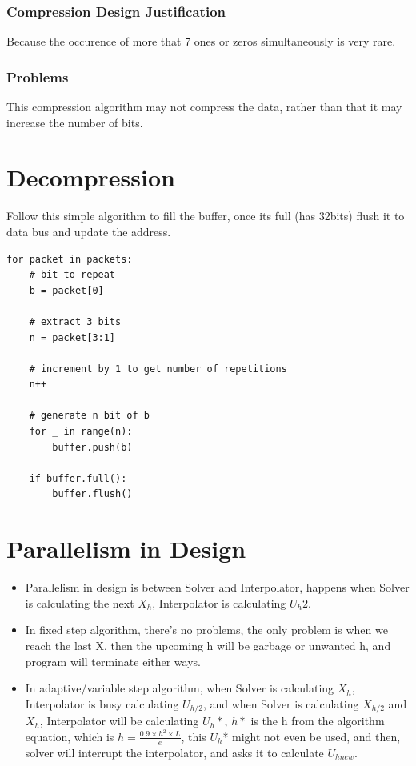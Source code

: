 \documentclass[12pt]{report}
\begin{document}
\subsubsection{Compression Design Justification}
Because the occurence of more that 7 ones or zeros simultaneously is very rare.

\subsubsection{Problems}
This compression algorithm may not compress the data, rather than that it may increase the number of bits.

\section{Decompression}
\label{sec:decomp}
Follow this simple algorithm to fill the buffer, once its full (has 32bits) flush it to data bus and update the address.

\begin{verbatim}
for packet in packets:
    # bit to repeat
    b = packet[0]

    # extract 3 bits
    n = packet[3:1]

    # increment by 1 to get number of repetitions
    n++

    # generate n bit of b
    for _ in range(n):
        buffer.push(b)

    if buffer.full():
        buffer.flush()
\end{verbatim}
        
\section{Parallelism in Design} 
\label{sec:parallel}  
\begin{itemize}
    \item Parallelism in design is between Solver and Interpolator, happens when Solver is calculating the next $X_h$, Interpolator is calculating $U_h2$.
    \item In fixed step algorithm, there's no problems, the only problem is when we reach the last X, then the upcoming h will be garbage or unwanted h, and program will terminate either ways.
    \item In adaptive/variable step algorithm, when Solver is calculating $X_h$, Interpolator is busy calculating $U_{h/2}$, and when Solver is calculating $X_{h/2}$ and $X_{h}$, Interpolator will be calculating $U_{h}*$, $h*$ is the h from the algorithm equation, which is $h = \frac{0.9 \times h^2 \times L}{e}$, this $U_{h}$* might not even be used, and then, solver will interrupt the interpolator, and asks it to calculate $U_{hnew}$.
\end{itemize}
\end{document}

